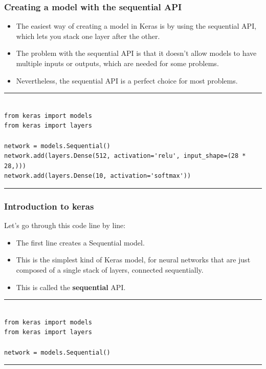 \documentclass[11pt]{beamer}
\begin{document}
%
%
\begin{frame}[fragile]
\frametitle{Creating a model with the sequential API }
	\begin{itemize}
		\item The easiest way of creating a model in Keras is by using the sequential API, which lets you stack one layer after the other. 
		\item The problem with the sequential API is that it doesn't allow models to have multiple inputs or outputs, which are needed for some problems.
		\item Nevertheless, the sequential API is a perfect choice for most problems.
	\end{itemize}
\rule{\textwidth}{1pt}
\scriptsize
\begin{verbatim}

from keras import models
from keras import layers

network = models.Sequential()
network.add(layers.Dense(512, activation='relu', input_shape=(28 * 28,)))
network.add(layers.Dense(10, activation='softmax'))

\end{verbatim}
\rule{\textwidth}{1pt}
\end{frame}
%
%
\begin{frame}[fragile]
\frametitle{Introduction to keras}
Let’s go through this code line by line:
\begin{itemize}
\item The first line creates a Sequential model. 
\item This is the simplest kind of Keras model, for neural networks that are just composed of a single stack of layers, connected sequentially. 
\item This is called the \textbf{sequential} API.
\end{itemize}

\rule{\textwidth}{1pt}
\scriptsize
\begin{verbatim}

from keras import models
from keras import layers

network = models.Sequential()

\end{verbatim}
\rule{\textwidth}{1pt}
\end{frame}
%
%
\end{document}

